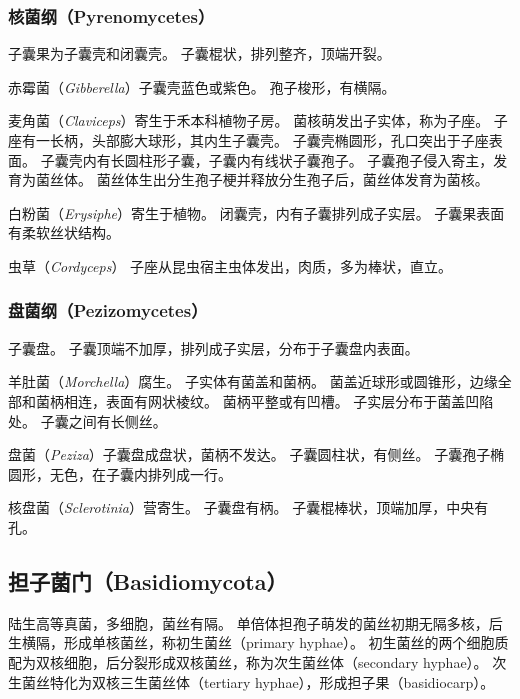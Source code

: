 \documentclass[11pt]{article}
\begin{document}
\subsubsection{核菌纲（Pyrenomycetes）}
子囊果为子囊壳和闭囊壳。
子囊棍状，排列整齐，顶端开裂。

\par

赤霉菌（\textit{Gibberella}）子囊壳蓝色或紫色。
孢子梭形，有横隔。

\par

麦角菌（\textit{Claviceps}）寄生于禾本科植物子房。
菌核萌发出子实体，称为子座。
子座有一长柄，头部膨大球形，其内生子囊壳。
子囊壳椭圆形，孔口突出于子座表面。
子囊壳内有长圆柱形子囊，子囊内有线状子囊孢子。
子囊孢子侵入寄主，发育为菌丝体。
菌丝体生出分生孢子梗并释放分生孢子后，菌丝体发育为菌核。

\par

白粉菌（\textit{Erysiphe}）寄生于植物。
闭囊壳，内有子囊排列成子实层。
子囊果表面有柔软丝状结构。

\par

虫草（\textit{Cordyceps}）
子座从昆虫宿主虫体发出，肉质，多为棒状，直立。

\subsubsection{盘菌纲（Pezizomycetes）}
子囊盘。
子囊顶端不加厚，排列成子实层，分布于子囊盘内表面。

\par

羊肚菌（\textit{Morchella}）腐生。
子实体有菌盖和菌柄。
菌盖近球形或圆锥形，边缘全部和菌柄相连，表面有网状棱纹。
菌柄平整或有凹槽。
子实层分布于菌盖凹陷处。
子囊之间有长侧丝。

\par

盘菌（\textit{Peziza}）子囊盘成盘状，菌柄不发达。
子囊圆柱状，有侧丝。
子囊孢子椭圆形，无色，在子囊内排列成一行。

\par

核盘菌（\textit{Sclerotinia}）营寄生。
子囊盘有柄。
子囊棍棒状，顶端加厚，中央有孔。

\subsection{担子菌门（Basidiomycota）}
陆生高等真菌，多细胞，菌丝有隔。
单倍体担孢子萌发的菌丝初期无隔多核，后生横隔，形成单核菌丝，称初生菌丝（primary hyphae）。
初生菌丝的两个细胞质配为双核细胞，后分裂形成双核菌丝，称为次生菌丝体（secondary hyphae）。
次生菌丝特化为双核三生菌丝体（tertiary hyphae），形成担子果（basidiocarp）。
\end{document}
